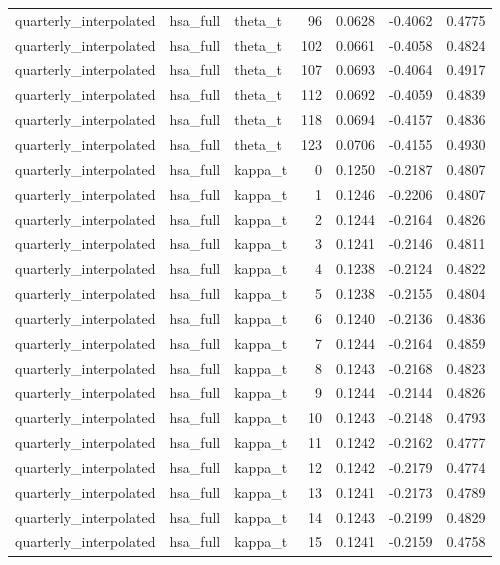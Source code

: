 \begin{tabular}{lllrrrr}
quarterly\_interpolated & hsa\_full & theta\_t & 96 & 0.0628 & -0.4062 & 0.4775 \\
quarterly\_interpolated & hsa\_full & theta\_t & 102 & 0.0661 & -0.4058 & 0.4824 \\
quarterly\_interpolated & hsa\_full & theta\_t & 107 & 0.0693 & -0.4064 & 0.4917 \\
quarterly\_interpolated & hsa\_full & theta\_t & 112 & 0.0692 & -0.4059 & 0.4839 \\
quarterly\_interpolated & hsa\_full & theta\_t & 118 & 0.0694 & -0.4157 & 0.4836 \\
quarterly\_interpolated & hsa\_full & theta\_t & 123 & 0.0706 & -0.4155 & 0.4930 \\
quarterly\_interpolated & hsa\_full & kappa\_t & 0 & 0.1250 & -0.2187 & 0.4807 \\
quarterly\_interpolated & hsa\_full & kappa\_t & 1 & 0.1246 & -0.2206 & 0.4807 \\
quarterly\_interpolated & hsa\_full & kappa\_t & 2 & 0.1244 & -0.2164 & 0.4826 \\
quarterly\_interpolated & hsa\_full & kappa\_t & 3 & 0.1241 & -0.2146 & 0.4811 \\
quarterly\_interpolated & hsa\_full & kappa\_t & 4 & 0.1238 & -0.2124 & 0.4822 \\
quarterly\_interpolated & hsa\_full & kappa\_t & 5 & 0.1238 & -0.2155 & 0.4804 \\
quarterly\_interpolated & hsa\_full & kappa\_t & 6 & 0.1240 & -0.2136 & 0.4836 \\
quarterly\_interpolated & hsa\_full & kappa\_t & 7 & 0.1244 & -0.2164 & 0.4859 \\
quarterly\_interpolated & hsa\_full & kappa\_t & 8 & 0.1243 & -0.2168 & 0.4823 \\
quarterly\_interpolated & hsa\_full & kappa\_t & 9 & 0.1244 & -0.2144 & 0.4826 \\
quarterly\_interpolated & hsa\_full & kappa\_t & 10 & 0.1243 & -0.2148 & 0.4793 \\
quarterly\_interpolated & hsa\_full & kappa\_t & 11 & 0.1242 & -0.2162 & 0.4777 \\
quarterly\_interpolated & hsa\_full & kappa\_t & 12 & 0.1242 & -0.2179 & 0.4774 \\
quarterly\_interpolated & hsa\_full & kappa\_t & 13 & 0.1241 & -0.2173 & 0.4789 \\
quarterly\_interpolated & hsa\_full & kappa\_t & 14 & 0.1243 & -0.2199 & 0.4829 \\
quarterly\_interpolated & hsa\_full & kappa\_t & 15 & 0.1241 & -0.2159 & 0.4758 \\

\end{tabular}
